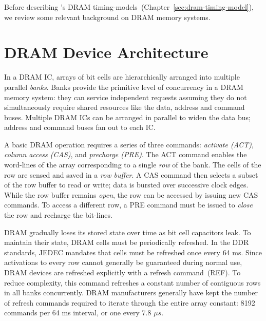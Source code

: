 Before describing \PNAME's DRAM timing-models~(Chapter~\ref{sec:dram-timing-model}), we review some relevant background
on DRAM memory systems.

\section{DRAM Device Architecture}\label{sec:dram-arch}
In a DRAM IC, arrays of bit cells are hierarchically arranged into multiple
parallel \textit{banks}. Banks provide the primitive level of concurrency in a
DRAM memory system: they can service independent requests assuming they do not
simultaneously require shared resources like the data, address and command
buses.  Multiple DRAM ICs can be arranged in parallel to widen the data bus;
address and command buses fan out to each IC.

A basic DRAM operation requires a series of three commands: \textit{activate (ACT)},
\textit{column access (CAS)}, and \textit{precharge (PRE)}. The ACT command
enables the word-lines of the array corresponding to a single \textit{row} of
the bank. The cells of the row are sensed and saved in a \textit{row
buffer}. A CAS command then selects a subset of the row buffer to
read or write; data is bursted over successive clock edges. While the row
buffer remains \textit{open}, the row can be accessed by issuing new CAS
commands. To access a different row, a PRE command must be
issued to \textit{close} the row and recharge the bit-lines.


DRAM gradually loses its stored state over time as bit cell capacitors leak. To
maintain their state, DRAM cells must be periodically refreshed. In the DDR
standards, JEDEC mandates that cells must be refreshed once every 64
ms. Since activations to every row cannot generally be guaranteed during normal
use, DRAM devices are refreshed explicitly with a refresh command~(REF). To
reduce complexity, this command refreshes a constant number of contiguous rows
in all banks concurrently. DRAM manufacturers generally have kept the number of
refresh commands required to iterate through the entire array constant: 8192
commands per 64 ms interval, or one every 7.8 $\mu s$.
